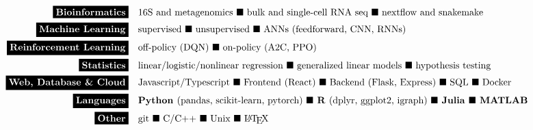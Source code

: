 \documentclass[10pt]{developercv} %
\begin{document}
%
%



\vspace{-4mm}
\begin{minipage}[t]{\textwidth}
	\vspace{-\baselineskip}
	\begin{align*}
    \colorbox{black}{\textcolor{white}{\textbf{Bioinformatics}}} &\quad \text{16S and metagenomics } \blacksquare \text{ bulk and single-cell RNA seq } \blacksquare \text{ nextflow and snakemake } \\
        \colorbox{black}{\textcolor{white}{\textbf{Machine Learning}}} &\quad \text{supervised } \blacksquare \text{ unsupervised } \blacksquare \text{ ANNs (feedforward, CNN, RNNs) }  \\
        \colorbox{black}{\textcolor{white}{\textbf{Reinforcement Learning}}} &\quad \text{off-policy (DQN) } \blacksquare \text{ on-policy (A2C, PPO) } \\
        \colorbox{black}{\textcolor{white}{\textbf{Statistics}}} &\quad \text{linear/logistic/nonlinear regression } \blacksquare \text{ generalized linear models } \blacksquare \text{ hypothesis testing } \\
        \colorbox{black}{\textcolor{white}{\textbf{Web, Database \& Cloud}}} &\quad \text{Javascript/Typescript } \blacksquare \text{ Frontend (React) } \blacksquare \text{ Backend (Flask, Express) } \blacksquare \text{ SQL } \blacksquare \text{ Docker } \\
        \colorbox{black}{\textcolor{white}{\textbf{Languages}}} &\quad \textbf{Python }\text{(pandas, scikit-learn, pytorch) } \blacksquare \textbf{ R }\text{(dplyr, ggplot2, igraph) } \blacksquare \textbf{ Julia } \blacksquare \textbf{ MATLAB}\\
        \colorbox{black}{\textcolor{white}{\textbf{Other}}} &\quad \text{git }
        \blacksquare \text{ C/C++ }\blacksquare \text{ Unix } \blacksquare \text{ \LaTeX }
	\end{align*}
\end{minipage}
\end{document}

